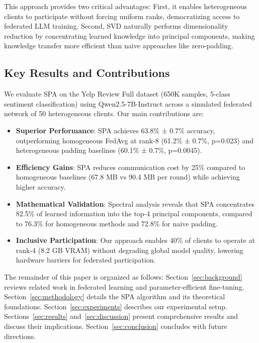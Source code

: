 \documentclass[conference]{IEEEtran}
\begin{document}
This approach provides two critical advantages: First, it enables heterogeneous clients to participate without forcing uniform ranks, democratizing access to federated LLM training. Second, SVD naturally performs dimensionality reduction by concentrating learned knowledge into principal components, making knowledge transfer more efficient than naive approaches like zero-padding.

\subsection{Key Results and Contributions}

We evaluate SPA on the Yelp Review Full dataset (650K samples, 5-class sentiment classification) using Qwen2.5-7B-Instruct across a simulated federated network of 50 heterogeneous clients. Our main contributions are:

\begin{itemize}
    \item \textbf{Superior Performance}: SPA achieves 63.8\% ± 0.7\% accuracy, outperforming homogeneous FedAvg at rank-8 (61.2\% ± 0.7\%, p=0.023) and heterogeneous padding baselines (60.1\% ± 0.7\%, p=0.0045).
    
    \item \textbf{Efficiency Gains}: SPA reduces communication cost by 25\% compared to homogeneous baselines (67.8 MB vs 90.4 MB per round) while achieving higher accuracy.
    
    \item \textbf{Mathematical Validation}: Spectral analysis reveals that SPA concentrates 82.5\% of learned information into the top-4 principal components, compared to 76.3\% for homogeneous methods and 72.8\% for naive padding.
    
    \item \textbf{Inclusive Participation}: Our approach enables 40\% of clients to operate at rank-4 (8.2 GB VRAM) without degrading global model quality, lowering hardware barriers for federated participation.
\end{itemize}

The remainder of this paper is organized as follows: Section~\ref{sec:background} reviews related work in federated learning and parameter-efficient fine-tuning. Section~\ref{sec:methodology} details the SPA algorithm and its theoretical foundations. Section~\ref{sec:experiments} describes our experimental setup. Sections~\ref{sec:results} and~\ref{sec:discussion} present comprehensive results and discuss their implications. Section~\ref{sec:conclusion} concludes with future directions.
\end{document}
